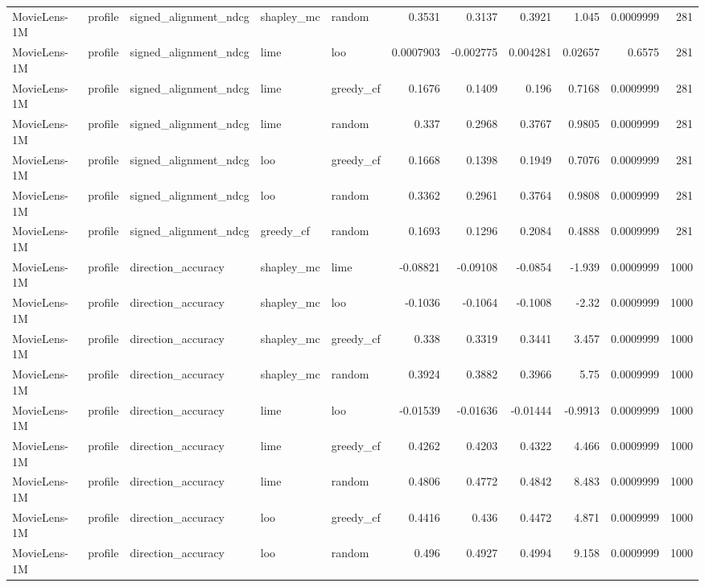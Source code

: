 \begin{table}[t]
\begin{tabular}{lllllrrrrrr}
MovieLens-1M & profile & signed\_alignment\_ndcg & shapley\_mc & random & 0.3531 & 0.3137 & 0.3921 & 1.045 & 0.0009999 & 281 \\
MovieLens-1M & profile & signed\_alignment\_ndcg & lime & loo & 0.0007903 & -0.002775 & 0.004281 & 0.02657 & 0.6575 & 281 \\
MovieLens-1M & profile & signed\_alignment\_ndcg & lime & greedy\_cf & 0.1676 & 0.1409 & 0.196 & 0.7168 & 0.0009999 & 281 \\
MovieLens-1M & profile & signed\_alignment\_ndcg & lime & random & 0.337 & 0.2968 & 0.3767 & 0.9805 & 0.0009999 & 281 \\
MovieLens-1M & profile & signed\_alignment\_ndcg & loo & greedy\_cf & 0.1668 & 0.1398 & 0.1949 & 0.7076 & 0.0009999 & 281 \\
MovieLens-1M & profile & signed\_alignment\_ndcg & loo & random & 0.3362 & 0.2961 & 0.3764 & 0.9808 & 0.0009999 & 281 \\
MovieLens-1M & profile & signed\_alignment\_ndcg & greedy\_cf & random & 0.1693 & 0.1296 & 0.2084 & 0.4888 & 0.0009999 & 281 \\
MovieLens-1M & profile & direction\_accuracy & shapley\_mc & lime & -0.08821 & -0.09108 & -0.0854 & -1.939 & 0.0009999 & 1000 \\
MovieLens-1M & profile & direction\_accuracy & shapley\_mc & loo & -0.1036 & -0.1064 & -0.1008 & -2.32 & 0.0009999 & 1000 \\
MovieLens-1M & profile & direction\_accuracy & shapley\_mc & greedy\_cf & 0.338 & 0.3319 & 0.3441 & 3.457 & 0.0009999 & 1000 \\
MovieLens-1M & profile & direction\_accuracy & shapley\_mc & random & 0.3924 & 0.3882 & 0.3966 & 5.75 & 0.0009999 & 1000 \\
MovieLens-1M & profile & direction\_accuracy & lime & loo & -0.01539 & -0.01636 & -0.01444 & -0.9913 & 0.0009999 & 1000 \\
MovieLens-1M & profile & direction\_accuracy & lime & greedy\_cf & 0.4262 & 0.4203 & 0.4322 & 4.466 & 0.0009999 & 1000 \\
MovieLens-1M & profile & direction\_accuracy & lime & random & 0.4806 & 0.4772 & 0.4842 & 8.483 & 0.0009999 & 1000 \\
MovieLens-1M & profile & direction\_accuracy & loo & greedy\_cf & 0.4416 & 0.436 & 0.4472 & 4.871 & 0.0009999 & 1000 \\
MovieLens-1M & profile & direction\_accuracy & loo & random & 0.496 & 0.4927 & 0.4994 & 9.158 & 0.0009999 & 1000 \\

\end{tabular}
\end{table}
